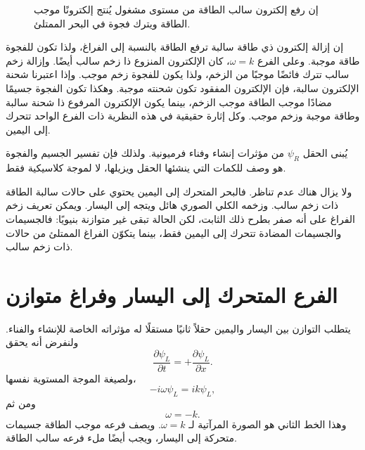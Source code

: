 \begin{figure}[htbp]
\centering
{}
\caption{إن رفع إلكترون سالب الطاقة من مستوى مشغول يُنتج إلكترونًا موجب الطاقة ويترك فجوة في البحر الممتلئ.}
\end{figure}

إن إزالة إلكترون ذي طاقة سالبة ترفع الطاقة بالنسبة إلى الفراغ، ولذا تكون للفجوة طاقة موجبة. وعلى الفرع \(\omega=k\)، كان الإلكترون المنزوع ذا زخم سالب أيضًا. وإزالة زخم سالب تترك فائضًا موجبًا من الزخم، ولذا يكون للفجوة زخم موجب. وإذا اعتبرنا شحنة الإلكترون سالبة، فإن الإلكترون المفقود تكون شحنته موجبة. وهكذا تكون الفجوة جسيمًا مضادًا موجب الطاقة موجب الزخم، بينما يكون الإلكترون المرفوع ذا شحنة سالبة وطاقة موجبة وزخم موجب. وكل إثارة حقيقية في هذه النظرية ذات الفرع الواحد تتحرك إلى اليمين.

يُبنى الحقل \(\psi_R\) من مؤثرات إنشاء وفناء فرميونية. ولذلك فإن تفسير الجسيم والفجوة هو وصف للكمات التي ينشئها الحقل ويزيلها، لا لموجة كلاسيكية فقط.

ولا يزال هناك عدم تناظر. فالبحر المتحرك إلى اليمين يحتوي على حالات سالبة الطاقة ذات زخم سالب. وزخمه الكلي الصوري هائل ويتجه إلى اليسار. ويمكن تعريف زخم الفراغ على أنه صفر بطرح ذلك الثابت، لكن الحالة تبقى غير متوازنة بنيويًا: فالجسيمات والجسيمات المضادة تتحرك إلى اليمين فقط، بينما يتكوّن الفراغ الممتلئ من حالات ذات زخم سالب.

\section{الفرع المتحرك إلى اليسار وفراغ متوازن}

يتطلب التوازن بين اليسار واليمين حقلاً ثانيًا مستقلًا له مؤثراته الخاصة للإنشاء والفناء. ولنفرض أنه يحقق
\begin{equation}
\frac{\partial\psi_L}{\partial t}
=
+\frac{\partial\psi_L}{\partial x}.
\end{equation}
ولصيغة الموجة المستوية نفسها،
\begin{equation}
-i\omega\psi_L=ik\psi_L,
\end{equation}
ومن ثم
\begin{equation}
\omega=-k.
\end{equation}
وهذا الخط الثاني هو الصورة المرآتية لـ \(\omega=k\). ويصف فرعه موجب الطاقة جسيمات متحركة إلى اليسار، ويجب أيضًا ملء فرعه سالب الطاقة.

